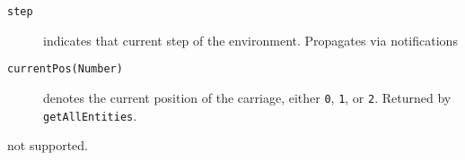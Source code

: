 \documentclass[a4]{article}
\begin{document}
\begin{description}
\item[\texttt{step}] indicates that current step of the environment. Propagates via notifications 
\item[\texttt{currentPos(Number)}] denotes the current position of the carriage, either \texttt{0}, \texttt{1}, or \texttt{2}.
Returned by \texttt{getAllEntities}.
\end{description}

 not supported.

\end{document}
